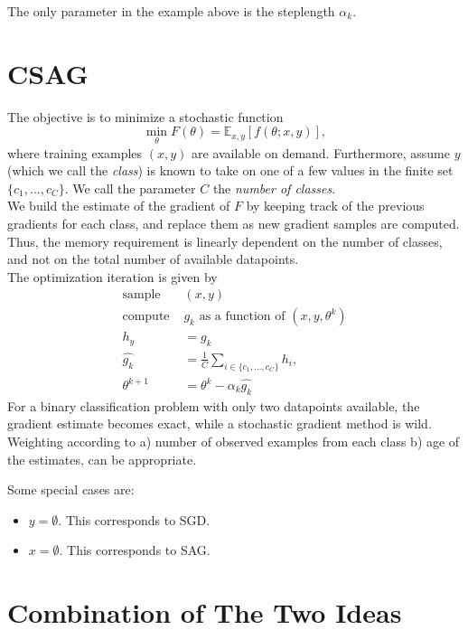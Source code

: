 \documentclass[12pt]{article}
\begin{document}
	
  	  The only parameter in the example above is the steplength $\alpha_k$.
	\section{CSAG}
	
	The objective is to minimize a stochastic function
	\begin{equation}
		\label{prob}
		\min_{\theta} F(\theta) = \mathbb{E}_{x,y}[ f(\theta;x,y)],
	\end{equation}
	where training examples $(x,y)$ are available on demand. Furthermore, assume $y$ (which we call the \emph{class}) is known to take on one of a few values in the finite set $\{c_1,...,c_C\}$. We call the parameter $C$ the \emph{number of classes}.\\
	We build the estimate of the gradient of $F$ by keeping track of the previous gradients for each class, and replace them as new gradient samples are computed. Thus, the memory requirement is linearly dependent on the number of classes, and not on the total number of available datapoints. \\
	The optimization iteration is given by	
	 \begin{align}
	   \mbox{sample } & (x,y) \\
	   \mbox{compute } &g_k \mbox{ as a function of }(x,y,\theta^k) \\
	   h_y &= g_k  \\
	   \hat{g_k} &= \frac{1}{C} \sum_{i \in \{c_1,...,c_C\}} h_i , \\
	   \theta^{k+1} &= \theta^k - \alpha_k \hat{g_k}
	 \end{align}
	For a binary classification problem with only two datapoints available, the gradient estimate becomes exact, while a stochastic gradient method is wild.\\
	Weighting according to a) number of observed examples from each class b) age of the estimates, can be appropriate.
	 
	
	Some special cases are:
	
	\begin{itemize}
		\item $y = \emptyset$. This corresponds to SGD. \\
		\item $x = \emptyset$. This corresponds to SAG. \\
	\end{itemize}
	

	
	\section{Combination of The Two Ideas}
	
\end{document}
